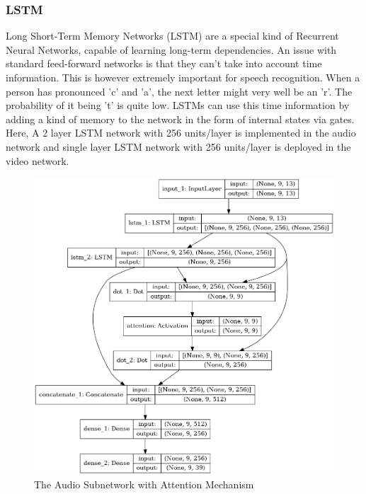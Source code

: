 \documentclass{article}
\begin{document}
\subsubsection{LSTM}
Long Short-Term Memory Networks (LSTM) \cite{LipreadingLSTM} are a special kind of Recurrent Neural Networks, capable of learning long-term dependencies. An issue with standard feed-forward networks is that they can't take into account time information. This is however extremely important for speech recognition. When a person has pronounced ’c’ and ’a’, the next letter might very well be an ’r’. The probability of it being ’t’ is quite low. LSTMs\cite{LSTM} can use this time information by adding a kind of memory to the network in the form of internal states via gates.
Here, A 2 layer LSTM network with 256 units/layer is implemented in the audio network and single layer LSTM network with 256 units/layer is deployed in the video network.
\begin{figure}
\centering
\includegraphics[scale=0.4]{audio_model_plot.png}
\caption{\label{fig:Audio SubNetwork Architecture}The Audio Subnetwork with Attention Mechanism}
\end{figure}
\end{document}
